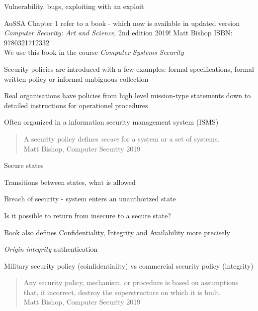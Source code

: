 \documentclass[Screen16to9,17pt]{foils}
\begin{document}

\begin{list2}
\item Vulnerability, bugs, exploiting with an exploit
\item
\item AoSSA Chapter 1 refer to a book - which now is available in updated version\\
\emph{Computer Security: Art and Science}, 2nd edition 2019! Matt Bishop ISBN: 9780321712332\\
We use this book in the course \emph{Computer Systems Security}
\item Security policies are introduced with a few examples: formal specifications, formal written policy or informal ambiguous collection
\item Real organisations have policies from high level mission-type statements down to detailed instructions for operationel procedures
\item Often organized in a information security management system (ISMS)
\end{list2}


\begin{quote}
A security policy defines \emph{secure} for a system or a set of systems.\\
Matt Bishop, Computer Security 2019
\end{quote}

\begin{list1}
\item Secure states
\item Transitions between states, what is allowed
\item Breach of security - system enters an unauthorized state
\item Is it possible to return from insecure to a secure state?
\item Book also defines Confidentiality, Integrity and Availability more precisely
\item \emph{Origin integrity} authentication
\item Military security policy (coinfidentiality) vs commercial security policy (integrity)
\end{list1}


\begin{quote}
Any security policy, mechanism, or procedure is based on assumptions that, if incorrect, destroy the superstructure on which it is built.\\
Matt Bishop, Computer Security 2019
\end{quote}
\end{document}
